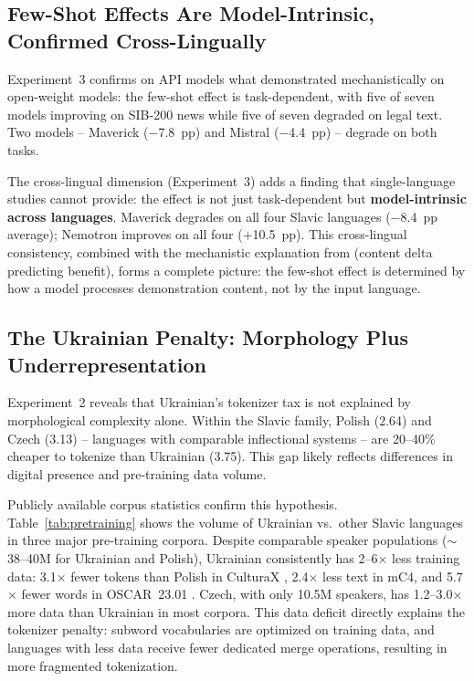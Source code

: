 \documentclass[11pt,a4paper]{article}
\begin{document}
\subsection{Few-Shot Effects Are Model-Intrinsic, Confirmed Cross-Lingually}

Experiment~3 confirms on API models what \citet{ovcharov2026fewshot} demonstrated mechanistically on open-weight models: the few-shot effect is task-dependent, with five of seven models improving on SIB-200 news while five of seven degraded on legal text. Two models -- Maverick ($-$7.8~pp) and Mistral ($-$4.4~pp) -- degrade on both tasks.

The cross-lingual dimension (Experiment~3) adds a finding that single-language studies cannot provide: the effect is not just task-dependent but \textbf{model-intrinsic across languages}. Maverick degrades on all four Slavic languages ($-$8.4~pp average); Nemotron improves on all four ($+$10.5~pp). This cross-lingual consistency, combined with the mechanistic explanation from \citet{ovcharov2026fewshot} (content delta predicting benefit), forms a complete picture: the few-shot effect is determined by how a model processes demonstration content, not by the input language.

\subsection{The Ukrainian Penalty: Morphology Plus Underrepresentation}

Experiment~2 reveals that Ukrainian's tokenizer tax is not explained by morphological complexity alone. Within the Slavic family, Polish (2.64) and Czech (3.13) -- languages with comparable inflectional systems -- are 20--40\% cheaper to tokenize than Ukrainian (3.75). This gap likely reflects differences in digital presence and pre-training data volume.

Publicly available corpus statistics confirm this hypothesis. Table~\ref{tab:pretraining} shows the volume of Ukrainian vs.\ other Slavic languages in three major pre-training corpora. Despite comparable speaker populations (${\sim}$38--40M for Ukrainian and Polish), Ukrainian consistently has 2--6$\times$ less training data: 3.1$\times$ fewer tokens than Polish in CulturaX \citep{nguyen2024culturax}, 2.4$\times$ less text in mC4, and 5.7$\times$ fewer words in OSCAR~23.01 \citep{abadji2022towards}. Czech, with only 10.5M speakers, has 1.2--3.0$\times$ more data than Ukrainian in most corpora. This data deficit directly explains the tokenizer penalty: subword vocabularies are optimized on training data, and languages with less data receive fewer dedicated merge operations, resulting in more fragmented tokenization.
\end{document}

